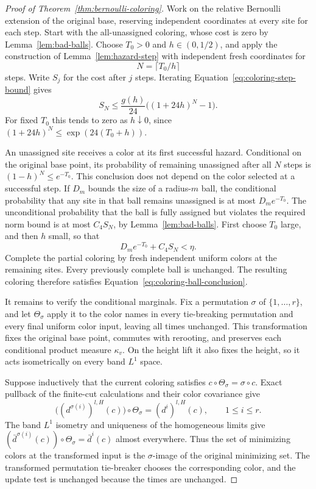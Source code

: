 \begin{proof}[Proof of Theorem~\ref{thm:bernoulli-coloring}]
Work on the relative Bernoulli extension of the original base, reserving
independent coordinates at every site for each step.  Start with the
all-unassigned coloring, whose cost is zero by Lemma~\ref{lem:bad-balls}.
Choose $T_0>0$ and $h\in(0,1/2)$, and apply the construction of
Lemma~\ref{lem:hazard-step} with independent fresh coordinates for
\[
 N=\lceil T_0/h\rceil
\]
steps.  Write $S_j$ for the cost after $j$ steps.  Iterating
Equation~\eqref{eq:coloring-step-bound} gives
\begin{equation}
 S_N\leq\frac{g(h)}{24}\bigl((1+24h)^N-1\bigr).
 \label{eq:coloring-iteration}
\end{equation}
For fixed $T_0$ this tends to zero as $h\downarrow0$, since
$(1+24h)^N\leq\exp(24(T_0+h))$.

An unassigned site receives a color at its first successful hazard.
Conditional on the original base point, its probability of remaining
unassigned after all $N$ steps is $(1-h)^N\leq e^{-T_0}$.  This conclusion
does not depend on the color selected at a successful step.  If $D_m$
bounds the size of a radius-$m$ ball, the conditional probability that
any site in that ball remains unassigned is at most $D_m e^{-T_0}$.
The unconditional probability that the ball is fully assigned but
violates the required norm bound is at most $C_4 S_N$, by
Lemma~\ref{lem:bad-balls}.  First choose $T_0$ large, and then $h$ small,
so that
\[
 D_m e^{-T_0}+C_4S_N<\eta.
\]
Complete the partial coloring by fresh independent uniform colors at the
remaining sites.  Every previously complete ball is unchanged.  The
resulting coloring therefore satisfies
Equation~\eqref{eq:coloring-ball-conclusion}.

It remains to verify the conditional marginals. Fix a permutation
$\sigma$ of $\{1,\ldots,r\}$, and let $\Theta_\sigma$ apply it to the color
names in every tie-breaking permutation and every final uniform color input,
leaving all times unchanged. This transformation fixes the original base
point, commutes with rerooting, and preserves each conditional product measure $\kappa_v$. On the
height lift it also fixes the height, so it acts isometrically on every
band $L^1$ space.

Suppose inductively that the current coloring satisfies
$c\circ\Theta_\sigma=\sigma\circ c$. Exact pullback of the finite-cut
calculations and their color covariance give
\[
 \bigl((d^{\sigma(i)})^{l,H}(c)\bigr)\circ\Theta_\sigma
       =(d^i)^{l,H}(c),\qquad 1\leq i\leq r.
\]
The band $L^1$ isometry and uniqueness of the homogeneous limits give
$(\bar d^{\sigma(i)}(c))\circ\Theta_\sigma=\bar d^i(c)$ almost everywhere.
Thus the set of minimizing colors at the transformed input is the
$\sigma$-image of the original minimizing set. The transformed
permutation tie-breaker chooses the corresponding color, and the update
test is unchanged because the times are unchanged.


\end{proof}
